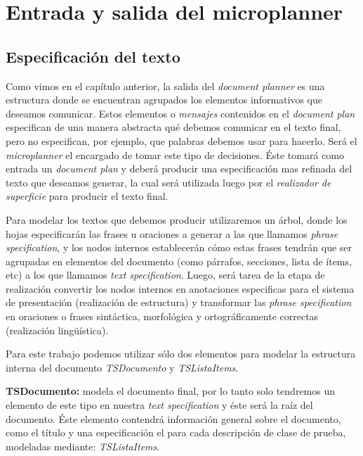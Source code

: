 \section{Entrada y salida del microplanner}

\subsection{Especificación del texto}

Como vimos en el capítulo anterior, la salida del  \textit{document planner} es una estructura donde se encuentran agrupados los elementos informativos que deseamos comunicar. Estos elementos o \emph{mensajes} contenidos en el \emph{document plan} especifican de una manera abstracta qué debemos comunicar en el texto final, pero no especifican, por ejemplo, que palabras debemos usar para hacerlo. Será el \textit{microplanner} el encargado de tomar este tipo de decisiones. Éste tomará como entrada un \textit{document plan} y deberá producir una especificación mas refinada del texto que deseamos generar, la cual será utilizada luego por el \emph{realizador de superficie} para producir el texto final.

Para modelar los textos que debemos producir utilizaremos un árbol, donde los hojas especificarán las frases u oraciones a generar a las que llamamos \emph{phrase specification}, y los nodos internos establecerán cómo estas frases tendrán que ser agrupadas en elementos del documento (como párrafos, secciones, lista de ítems, etc) a los que llamamos \emph{text specification}. Luego, será tarea de la etapa de realización convertir los nodos internos en anotaciones especificas para el sistema de presentación (realización de estructura) y transformar las \emph{phrase specification} en oraciones o frases sintáctica, morfológica y ortográficamente correctas (realización lingüística).

Para este trabajo podemos utilizar sólo dos elementos para modelar la estructura interna del documento \emph{TSDocumento} y \emph{TSListaItems}.

\medskip
\noindent
\textbf{TSDocumento:} modela el documento final, por lo tanto solo tendremos un elemento de este tipo en nuestra \emph{text specification} y éste será la raíz del documento. Éste elemento contendrá información general sobre el documento, como el título y una especificación el para cada descripción de clase de prueba, modeladas mediante: \emph{TSListaItems}.

